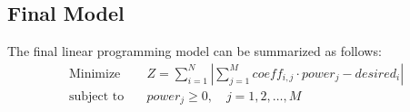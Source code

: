 \documentclass{article}
\begin{document}
\subsection*{Final Model}
The final linear programming model can be summarized as follows:
\[
\begin{align*}
\text{Minimize} \quad & Z = \sum_{i=1}^{N} | \sum_{j=1}^{M} coeff_{i,j} \cdot power_j - desired_i | \\
\text{subject to} \quad & power_j \geq 0, \quad j = 1, 2, \ldots, M
\end{align*}
\]
\end{document}
